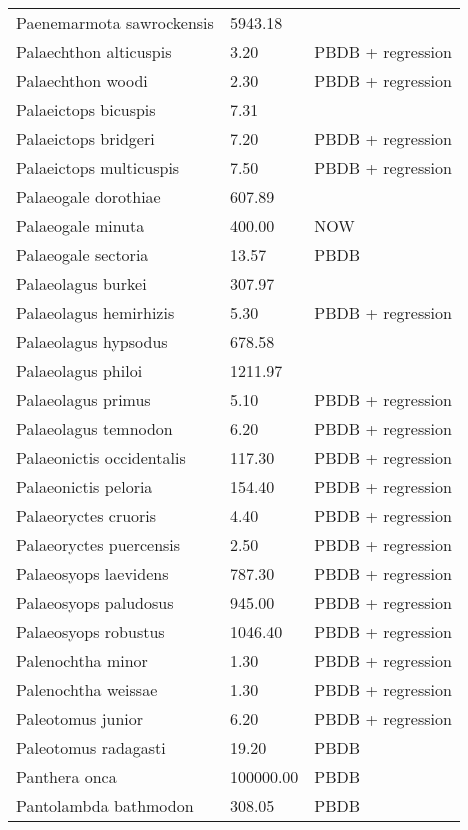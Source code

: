\documentclass{article}
\begin{document}
\begin{center}
\begin{longtable}{p{} p{} p{}}
    Paenemarmota sawrockensis & 5943.18 & \cite{Tomiya2013} \\ 
    Palaechthon alticuspis & 3.20 & PBDB + regression \\ 
    Palaechthon woodi & 2.30 & PBDB + regression \\ 
    Palaeictops bicuspis & 7.31 & \cite{Simons1960} \\ 
    Palaeictops bridgeri & 7.20 & PBDB + regression \\ 
    Palaeictops multicuspis & 7.50 & PBDB + regression \\ 
    Palaeogale dorothiae & 607.89 & \cite{Tomiya2013} \\ 
    Palaeogale minuta & 400.00 & NOW \\ 
    Palaeogale sectoria & 13.57 & PBDB \\ 
    Palaeolagus burkei & 307.97 & \cite{Tomiya2013} \\ 
    Palaeolagus hemirhizis & 5.30 & PBDB + regression \\ 
    Palaeolagus hypsodus & 678.58 & \cite{Tomiya2013} \\ 
    Palaeolagus philoi & 1211.97 & \cite{Tomiya2013} \\ 
    Palaeolagus primus & 5.10 & PBDB + regression \\ 
    Palaeolagus temnodon & 6.20 & PBDB + regression \\ 
    Palaeonictis occidentalis & 117.30 & PBDB + regression \\ 
    Palaeonictis peloria & 154.40 & PBDB + regression \\ 
    Palaeoryctes cruoris & 4.40 & PBDB + regression \\ 
    Palaeoryctes puercensis & 2.50 & PBDB + regression \\ 
    Palaeosyops laevidens & 787.30 & PBDB + regression \\ 
    Palaeosyops paludosus & 945.00 & PBDB + regression \\ 
    Palaeosyops robustus & 1046.40 & PBDB + regression \\ 
    Palenochtha minor & 1.30 & PBDB + regression \\ 
    Palenochtha weissae & 1.30 & PBDB + regression \\ 
    Paleotomus junior & 6.20 & PBDB + regression \\ 
    Paleotomus radagasti & 19.20 & PBDB \\ 
    Panthera onca & 100000.00 & PBDB \\ 
    Pantolambda bathmodon & 308.05 & PBDB \\ 

\end{longtable}
\end{center}
\end{document}
